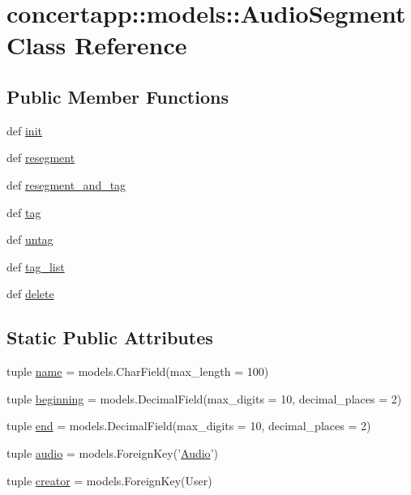 \hypertarget{classconcertapp_1_1models_1_1_audio_segment}{
\section{concertapp::models::AudioSegment Class Reference}
\label{classconcertapp_1_1models_1_1_audio_segment}
}
\subsection*{Public Member Functions}
\begin{DoxyCompactItemize}
\item 
def \hyperlink{classconcertapp_1_1models_1_1_audio_segment_affce2977202c54a2f7dee0ad96c62a7b}{init}
\item 
def \hyperlink{classconcertapp_1_1models_1_1_audio_segment_aad0077a4bb5abe5461037617ba0d5857}{resegment}
\item 
def \hyperlink{classconcertapp_1_1models_1_1_audio_segment_a0b1e1827fb85d4c9e11348a1dda0e526}{resegment\_\-and\_\-tag}
\item 
def \hyperlink{classconcertapp_1_1models_1_1_audio_segment_abf1ed6643134cc1ead4c3c8f726cb184}{tag}
\item 
def \hyperlink{classconcertapp_1_1models_1_1_audio_segment_a1016f30c28fcbac733b8772dd942fc0e}{untag}
\item 
def \hyperlink{classconcertapp_1_1models_1_1_audio_segment_afa83f9b5a6de4e43f8a9b49e2513c94f}{tag\_\-list}
\item 
def \hyperlink{classconcertapp_1_1models_1_1_audio_segment_a63ff6ec5e4bb223ad797e26e2df6f070}{delete}
\end{DoxyCompactItemize}
\subsection*{Static Public Attributes}
\begin{DoxyCompactItemize}
\item 
tuple \hyperlink{classconcertapp_1_1models_1_1_audio_segment_acb5c961694a3f5256efc69dcf0611a5b}{name} = models.CharField(max\_\-length = 100)
\item 
tuple \hyperlink{classconcertapp_1_1models_1_1_audio_segment_ae570405a871fbb22dd5b0ed90b719beb}{beginning} = models.DecimalField(max\_\-digits = 10, decimal\_\-places = 2)
\item 
tuple \hyperlink{classconcertapp_1_1models_1_1_audio_segment_ad57bff6ba4812881057215a7b31d452c}{end} = models.DecimalField(max\_\-digits = 10, decimal\_\-places = 2)
\item 
tuple \hyperlink{classconcertapp_1_1models_1_1_audio_segment_a5f742ddad4cd9d714aac17a770eab421}{audio} = models.ForeignKey('\hyperlink{classconcertapp_1_1models_1_1_audio}{Audio}')
\item 
tuple \hyperlink{classconcertapp_1_1models_1_1_audio_segment_af4c1782a5b5ea04fbb5605b78f81495a}{creator} = models.ForeignKey(User)
\end{DoxyCompactItemize}



